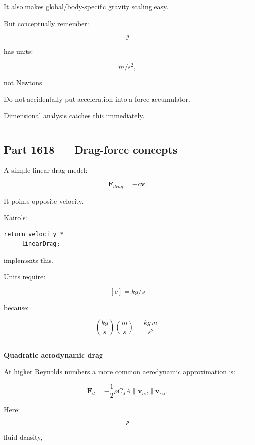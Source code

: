 It also makes global/body-specific gravity scaling easy.

But conceptually remember:

\[
g
\]

has units:

\[
m/s^2,
\]

not Newtons.

Do not accidentally put acceleration into a force accumulator.

Dimensional analysis catches this immediately.

\begin{center}\rule{0.5\linewidth}{0.5pt}\end{center}

\subsection{Part 1618 --- Drag-force concepts}\label{06-engine-ii-ch034-part-1618-drag-force-concepts}

\hypertarget{06-engine-ii-ch034-part-1618-drag-force-concepts}{}

A simple linear drag model:

\[
\boxed{
\mathbf{F}_{drag}
=
-c\mathbf{v}.
}
\]

It points opposite velocity.

Kairo's:

\begin{verbatim}
return velocity *
    -linearDrag;
\end{verbatim}

implements this.

Units require:

\[
[c]
=
kg/s
\]

because:

\[
\left(\frac{kg}{s}\right)
\left(\frac{m}{s}\right)
=
\frac{kg\,m}{s^2}.
\]

\begin{center}\rule{0.5\linewidth}{0.5pt}\end{center}

\textbf{Quadratic aerodynamic drag}

At higher Reynolds numbers a more common aerodynamic approximation is:

\[
\boxed{
\mathbf{F}_d
=
-\frac12
\rho C_d A
\|\mathbf{v}_{rel}\|
\mathbf{v}_{rel}.
}
\]

Here:

\[
\rho
\]

fluid density,

